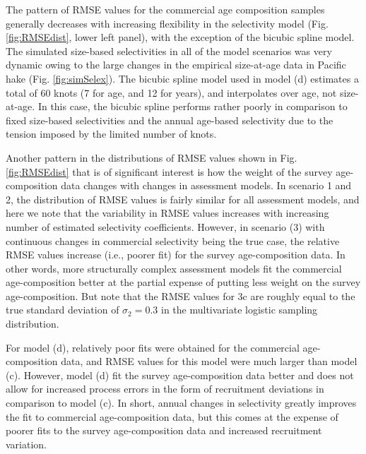 The pattern of RMSE values for the commercial age composition samples generally decreases with increasing flexibility in the selectivity model (Fig. \ref{fig:RMSEdist}, lower left panel), with the exception of the bicubic spline model.  The simulated size-based selectivities in all of the model scenarios was very dynamic owing to the large changes in the empirical size-at-age data in Pacific hake (Fig. \ref{fig:simSelex}). The bicubic spline model used in model (d) estimates a total of 60 knots (7 for age, and 12 for years), and interpolates over age, not size-at-age.  In this case, the bicubic spline performs rather poorly in comparison to fixed size-based selectivities and the annual age-based selectivity due to the tension imposed by the limited number of knots.

Another pattern in the distributions of RMSE values shown in Fig. \ref{fig:RMSEdist} that is of significant interest is how the weight of the survey age-composition data changes with changes in assessment models.  In scenario 1 and 2, the distribution of RMSE values is fairly similar for all assessment models, and here we note that the variability in RMSE values increases with increasing number of estimated selectivity coefficients.  However, in scenario (3) with continuous changes in commercial selectivity being the true case, the relative RMSE values increase (i.e., poorer fit) for the survey age-composition data.  In other words, more structurally complex assessment models fit the commercial age-composition better at the partial expense of putting less weight on the survey age-composition.  But note that the RMSE values for 3c are roughly equal to the true standard deviation of $\sigma_2=0.3$ in the multivariate logistic sampling distribution.  

For model (d), relatively poor fits were obtained for the commercial age-composition data, and RMSE values for this model were much larger than model (c).  However, model (d) fit the survey age-composition data better and does not allow for increased process errors in the form of recruitment deviations in comparison to model (c).  In short, annual changes in selectivity greatly improves the fit to commercial age-composition data, but this comes at the expense of poorer fits to the survey age-composition data and increased recruitment variation. 


